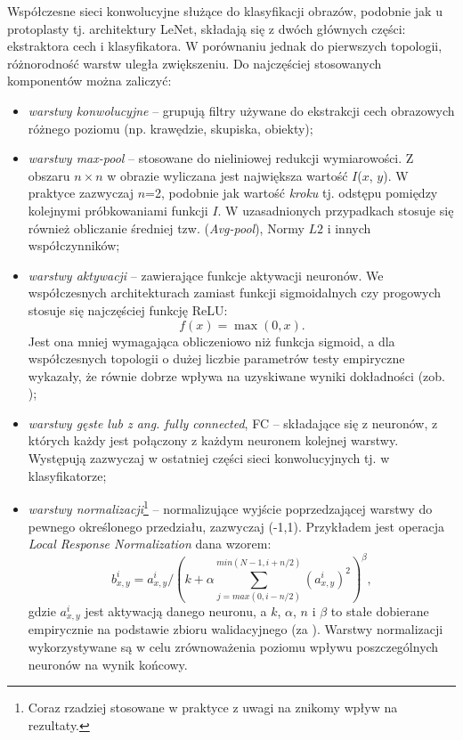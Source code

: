 Współczesne sieci konwolucyjne służące do klasyfikacji obrazów, podobnie jak u protoplasty tj. architektury LeNet, składają się z dwóch głównych części: ekstraktora cech i klasyfikatora. W porównaniu jednak do pierwszych topologii, różnorodność warstw uległa zwiększeniu. Do najczęściej stosowanych komponentów można zaliczyć:
\begin{itemize}[noitemsep,nolistsep]
	\item \textit{warstwy konwolucyjne} -- grupują filtry używane do ekstrakcji cech obrazowych różnego poziomu (np. krawędzie, skupiska, obiekty);
	\item \textit{warstwy max-pool} -- stosowane do nieliniowej redukcji wymiarowości. Z obszaru $n\times$$n$ w obrazie wyliczana jest największa wartość $I$($x$, $y$). W praktyce zazwyczaj $n$=2, podobnie jak wartość \textit{kroku} tj. odstępu pomiędzy kolejnymi próbkowaniami funkcji $I$. W uzasadnionych przypadkach stosuje się również obliczanie średniej tzw. (\textit{Avg-pool}), Normy $L2$ i innych współczynników;
	\item \textit{warstwy aktywacji} -- zawierające funkcje aktywacji neuronów. We współczesnych architekturach zamiast funkcji sigmoidalnych czy progowych stosuje się najczęściej funkcję ReLU:
	\begin{equation}
		f(x) = \max(0, x).
	\end{equation}
	Jest ona mniej wymagająca obliczeniowo niż funkcja sigmoid, a dla współczesnych topologii o dużej liczbie parametrów testy empiryczne wykazały, że równie dobrze wpływa na uzyskiwane wyniki dokładności (zob. \cite{Krizhevsky2012}); 
	\item \textit{warstwy gęste lub z ang. fully connected}, FC -- składające się z neuronów, z których każdy jest połączony z każdym neuronem kolejnej warstwy. Występują zazwyczaj w ostatniej części sieci konwolucyjnych tj. w klasyfikatorze;
	\item \textit{warstwy normalizacji}\footnote{Coraz rzadziej stosowane w praktyce z uwagi na znikomy wpływ na rezultaty.} -- normalizujące wyjście poprzedzającej warstwy do pewnego określonego przedziału, zazwyczaj (-1,1). Przykładem jest operacja \textit{Local Response Normalization} dana wzorem:
	\begin{equation}
	\label{DLnormEquation}
	b_{x,y}^{i} = a_{x,y}^{i}/\left ( k + \alpha \sum_{j=max(0,i-n/2)}^{min(N-1,i+n/2)}(a_{x,y}^{i})^2 \right )^\beta,
	\end{equation}
	gdzie $a_{x,y}^{i}$ jest aktywacją danego neuronu, a $k$, $\alpha$, $n$ i $\beta$ to stałe dobierane empirycznie na podstawie zbioru walidacyjnego (za \cite{Krizhevsky2012}). Warstwy normalizacji wykorzystywane są w celu zrównoważenia poziomu wpływu poszczególnych neuronów na wynik końcowy.
\end{itemize}

